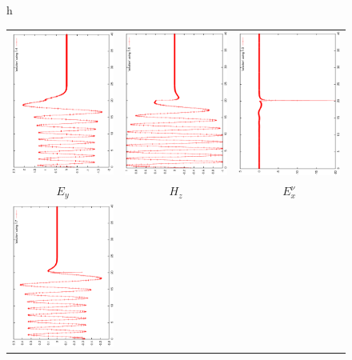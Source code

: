 \begin{figure}{h}
	\begin{center}
		\begin{tabular}{ccc}
			\includegraphics[angle=-90,width=5.cm]{pics_semilagrange/Ey_moit.eps}
			&
			\includegraphics[angle=-90,width=5.cm]{pics_semilagrange/Hz_moit.eps} &
			\includegraphics[angle=-90,width=5.cm]{pics_semilagrange/Ex_moit.eps}
			\\
			$E_y$ & $H_z$  & $E_x^\nu$ \\
			\hline
			\includegraphics[angle=-90,width=5.cm]{pics_semilagrange/uy_moit.eps}

\end{tabular}
\end{center}
\end{figure}
